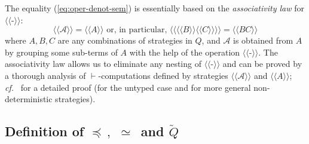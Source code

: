 \documentclass[fleqn]{LMCS}
\theoremstyle{plain}\newtheorem{satz}[thm]{Satz}
\theoremstyle{plain}\newtheorem{hyp}[thm]{Hypothesis}
\theoremstyle{plain}\newtheorem{hyps}[thm]{Hypotheses}
\theoremstyle{definition}\newtheorem{note}[thm]{Note}
\def\cf{{\em cf.}}
\newcommand{\lla}{\langle\!\langle}
\newcommand{\rra}{\rangle\!\rangle}
\newcommand{\Osem}[1]{\lla #1 \rra}
\newcommand{\tQ}{\tilde{Q}}
\newcommand{\lee}{\preceq}
\newcommand{\?}{\mbox{?}}
\begin{document}
The equality (\ref{eq:oper-denot-sem}) is essentially based on the 
\emph{associativity law} for  
$\Osem{\mbox{-}}$:
\begin{equation}\label{eq:assoc}
\Osem{{\mathcal A}} = \Osem{A}\mbox{  or, in particular, }
\Osem{\Osem{B}\Osem{C}} = \Osem{BC}
\end{equation}
where $A,B,C$ are  any combinations of strategies in $Q$, and ${\mathcal A}$ is
obtained from $A$ by grouping some sub-terms of $A$ with the help of
the operation $\Osem{\mbox{-}}$. 
The associativity law allows us to eliminate any nesting of $\Osem{\mbox{-}}$ 
and can be proved by a
thorough  analysis of $\vdash$-computations defined by strategies
$\Osem{\mathcal A}$ and $\Osem{A}$; \cf~\cite{Saz76SMZH} for a detailed proof 
(for the untyped case and for more general non-deterministic strategies). 


\subsection{Definition of 
\texorpdfstring{$\lee\,,$ $\simeq\,$ and $\tQ$}{tilde-Q}}
\label{sec:def-of-tQ}
\end{document}

